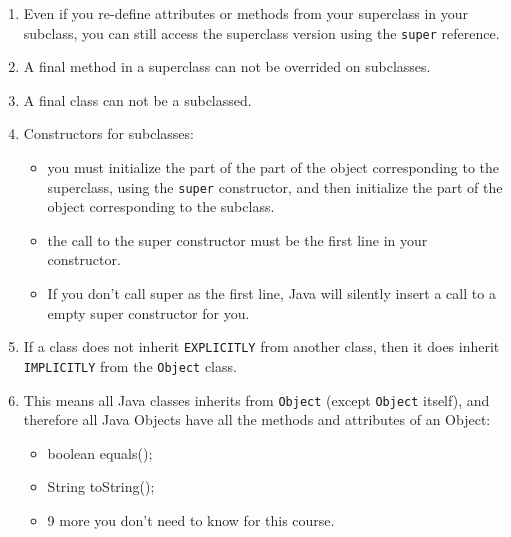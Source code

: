 \documentclass[a4paper, 9pt]{extarticle}
\begin{document}
\begin{enumerate}
  \item Even if you re-define attributes or methods from your superclass in
    your subclass, you can still access the superclass version using the
    \verb+super+ reference.

  \item A final method in a superclass can not be overrided on subclasses.

  \item A final class can not be a subclassed.

  \item Constructors for subclasses:

    \begin{itemize}

      \item you must initialize the part of the part of the object
        corresponding to the superclass, using the \verb+super+ constructor,
        and then initialize the part of the object corresponding to the
        subclass.

      \item the call to the super constructor must be the first line in your
        constructor.

      \item If you don't call super as the first line, Java will silently
        insert a call to a empty super constructor for you.

    \end{itemize}

  \item If a class does not inherit \verb+EXPLICITLY+ from another class, then
    it does inherit \verb+IMPLICITLY+ from the \verb+Object+ class.

  \item This means all Java classes inherits from \verb+Object+ (except
    \verb+Object+ itself), and therefore all Java Objects have all the methods and
    attributes of an Object:

      \begin{itemize}

        \item boolean equals();

        \item String toString();

        \item 9 more you don't need to know for this course.

      \end{itemize}

\end{enumerate}
\end{document}

